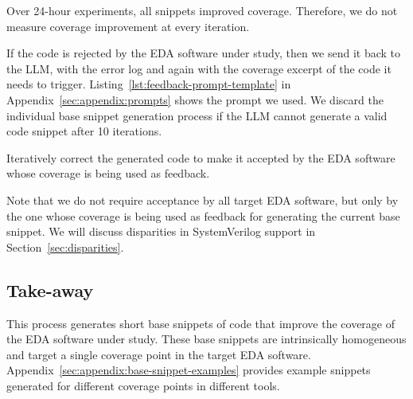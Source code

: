 Over 24-hour experiments, all snippets improved coverage.
Therefore, we do not measure coverage improvement at every iteration.

If the code is rejected by the EDA software under study, then we send it back to the LLM,
with the error log and again with the coverage excerpt of the code it needs to trigger.
Listing~\ref{lst:feedback-prompt-template} in Appendix~\ref{sec:appendix:prompts} shows the prompt we used.
We discard the individual base snippet generation process if the LLM cannot generate a valid code snippet after 10 iterations.

\begin{newdesignprinciple}
    Iteratively correct the generated code to make it accepted by the EDA software whose coverage is being used as feedback.
\end{newdesignprinciple}

Note that we do not require acceptance by all target EDA software, but only by the one whose coverage is being used as feedback for generating the current base snippet.
We will discuss disparities in SystemVerilog support in Section~\ref{sec:disparities}.


\subsection{Take-away}

This process generates short base snippets of code that improve the coverage of the EDA software under study.
These base snippets are intrinsically homogeneous and target a single coverage point in the target EDA software.
Appendix~\ref{sec:appendix:base-snippet-examples} provides example snippets generated for different coverage points in different tools.
